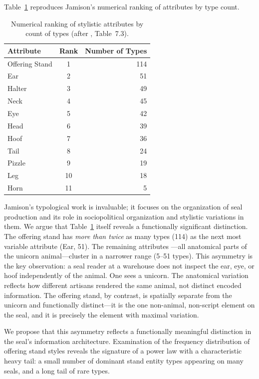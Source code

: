 \documentclass[12pt]{article}
\begin{document}
Table~\ref{tab:attributes} reproduces Jamison's numerical ranking of attributes by type count.

\begin{table}[h]
\centering
\caption{Numerical ranking of stylistic attributes by count of types
(after \citealt{jamison2017}, Table~7.3).}
\label{tab:attributes}
\begin{tabular}{@{}lcr@{}}
\toprule
Attribute & Rank & Number of Types \\
\midrule
Offering Stand & 1  & 114 \\
Ear            & 2  & 51 \\
Halter         & 3  & 49 \\
Neck           & 4  & 45 \\
Eye            & 5  & 42 \\
Head           & 6  & 39 \\
Hoof           & 7  & 36 \\
Tail           & 8  & 24 \\
Pizzle         & 9  & 19 \\
Leg            & 10 & 18 \\
Horn           & 11 & 5 \\
\bottomrule
\end{tabular}
\end{table}

Jamison's typological work is invaluable; it focuses on the organization
of seal production and its role in sociopolitical organization and stylistic
variations in them. We argue that Table~\ref{tab:attributes} itself reveals
a functionally significant distinction. The offering stand has \emph{more than
twice} as many types (114) as the next most variable attribute (Ear, 51). The
remaining attributes ---all anatomical parts of the unicorn animal---cluster in
a narrower range (5--51 types). This asymmetry is the key observation: a seal
reader at a warehouse does not inspect the ear, eye, or hoof independently of
the animal. One sees a unicorn. The anatomical variation reflects how different
artisans rendered the same animal, not distinct encoded information. The offering
stand, by contrast, is spatially separate from the unicorn and functionally
distinct---it is the one non-animal, non-script element on the seal, and it
is precisely the element with maximal variation.

We propose that this asymmetry reflects a functionally meaningful distinction
in the seal's information architecture. Examination of the frequency
distribution of offering stand styles reveals the signature of a power law
with a characteristic heavy tail: a small number of dominant stand
entity types appearing on many seals, and a long tail of rare types.
\end{document}
